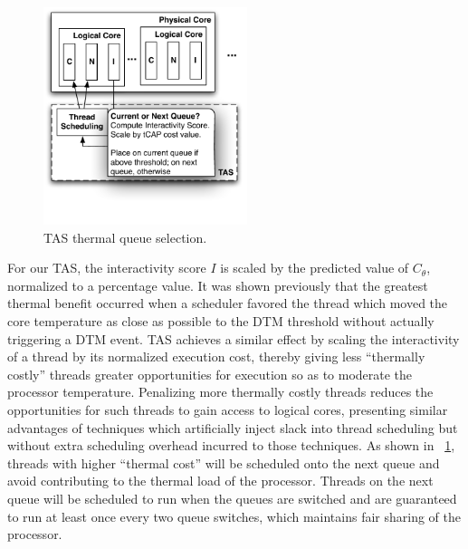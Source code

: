 \documentclass[times, 10pt,twocolumn]{IEEEtran}
\begin{document}
\begin{figure}[t]
  \centering
  \includegraphics[width=1.0\linewidth,height=2.5in]{threadselect}
  \caption{TAS thermal queue selection.}
  \label{fig:tasselect}
\end{figure}
For our TAS, the interactivity score $I$ is scaled by the predicted
value of $C_{\theta}$, normalized to a percentage value.  It was shown
previously \cite{Zhou2010b} that the greatest thermal benefit occurred
when a scheduler favored the thread which moved the core temperature as
close as possible to the DTM threshold without actually triggering a DTM
event.  TAS achieves a similar effect by scaling the interactivity of a
thread by its normalized execution cost, thereby giving less ``thermally
costly'' threads greater opportunities for execution so as to moderate
the processor temperature.  Penalizing more thermally costly threads
reduces the opportunities for such threads to gain access to logical
cores, presenting similar advantages of techniques which artificially
inject slack into thread scheduling but without extra scheduling
overhead incurred to those techniques.  As shown in
\figurename~\ref{fig:tasselect}, threads with higher ``thermal cost''
will be scheduled onto the next queue and avoid contributing to the
thermal load of the processor.  Threads on the next queue will be
scheduled to run when the queues are switched and are guaranteed to run
at least once every two queue switches, which maintains fair sharing of
the processor.
\end{document}
